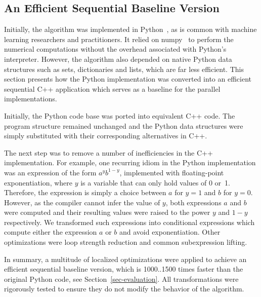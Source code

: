 \subsection{An Efficient Sequential Baseline Version}
\label{sec-design-sequential}

Initially, the algorithm was implemented in Python~\cite{LiAW15}, as is common
with machine learning researchers and practitioners. It
relied on numpy~\cite{numpy} to perform the numerical computations without the
overhead associated with Python's interpreter. However, the algorithm also
depended on native Python data structures such as sets, dictionaries and
lists, which are far less efficient.
This section presents how the Python implementation was
converted into an efficient sequential C++ application which serves as a
baseline for the parallel implementations.

Initially, the Python code base was ported into equivalent C++ code.
The program structure remained unchanged and the Python data structures were
simply substituted with their corresponding alternatives in C++.

The next step was to remove a number of inefficiencies in the C++
implementation. For example, one recurring idiom in the Python implementation
was an expression of the form $a^y b^{1-y}$, implemented with floating-point
exponentiation, where $y$ is a variable that can
only hold values of 0 or~1. Therefore, the expression is simply a choice
between $a$ for $y=1$ and $b$ for $y=0$. However, as the compiler cannot infer
the value of $y$, both expressions $a$ and $b$ were computed and their
resulting values were raised to the power $y$ and $1-y$ respectively.
We transformed such expressions into conditional expressions which
compute either the expression $a$ or $b$ and avoid exponentiation.
%
Other optimizations were loop strength
reduction and common subexpression lifting.

In summary, a multitude of localized optimizations were applied to achieve
an efficient sequential baseline version, which is 1000..1500 times faster
than the original Python code, see Section~\ref{sec-evaluation}.
All transformations were rigorously tested to ensure they do
not modify the behavior of the algorithm.

\begin{comment}
Further, we replaced calls to the system's random
functions with a custom implementation of the random generator
\textit{xorshift\_128}~\cite{Marsaglia:2003:XR}. This way, random calls no longer
involve system calls, so we can support easy and fast multi-threaded random
calls by providing each thread with its private, differently seeded, random
generator.
\end{comment}

